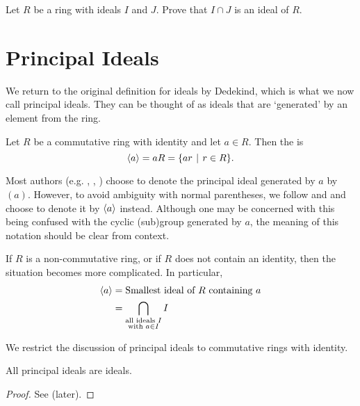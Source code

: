\begin{exercise}
    Let $R$ be a ring with ideals $I$ and $J$. Prove that $I \cap J$ is an ideal of $R$.
\end{exercise}

\section{Principal Ideals}
We return to the original definition for ideals by Dedekind, which is what we now call principal ideals. They can be thought of as ideals that are `generated' by an element from the ring.
\begin{definition}
    Let $R$ be a commutative ring with identity and let $a \in R$. Then the  is
    \[
        \princ{a} = aR = \{ar \vert r \in R\}.
    \]
\end{definition}
\begin{remark}
    Most authors (e.g. \cite[p.~123, Definition III.2.4]{hungerford_1980}, \cite[\S 158]{clark_1984}, \cite[p.~251]{dummit_foote_2004}) choose to denote the principal ideal generated by $a$ by $(a)$. However, to avoid ambiguity with normal parentheses, we follow \cite[p.~250, Example 3]{gallian_2016} and \cite[Example 16.24]{judson_beezer_2022} and choose to denote it by $\left\langle a\right\rangle$ instead. Although one may be concerned with this being confused with the cyclic (sub)group generated by $a$, the meaning of this notation should be clear from context.
\end{remark}
\begin{remark}
    If $R$ is a non-commutative ring, or if $R$ does not contain an identity, then the situation becomes more complicated. In particular,
    \begin{align*}
        \left\langle a\right\rangle &= \text{Smallest ideal of } R \text{ containing }a\\
        &= \bigcap_{\substack{\text{all ideals }I \\ \text{with } a \in I}}I
    \end{align*}
\end{remark}

We restrict the discussion of principal ideals to commutative rings with identity.

\begin{proposition}
    All principal ideals are ideals.
\end{proposition}
\begin{proof}
    See  (later).
\end{proof}

